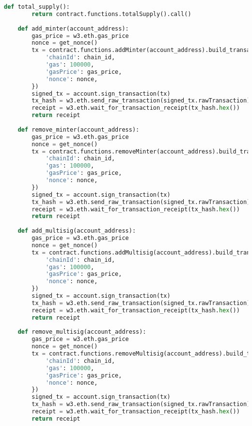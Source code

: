 \begin{lstlisting}[language=Python, caption=Функции выпуска дипломов]
    def total_supply():
        return contract.functions.totalSupply().call()
    
    def add_minter(account_address):
        gas_price = w3.eth.gas_price
        nonce = get_nonce()
        tx = contract.functions.addMinter(account_address).build_transaction({
            'chainId': chain_id,
            'gas': 100000,
            'gasPrice': gas_price,
            'nonce': nonce,
        })
        signed_tx = account.sign_transaction(tx)
        tx_hash = w3.eth.send_raw_transaction(signed_tx.rawTransaction)
        receipt = w3.eth.wait_for_transaction_receipt(tx_hash.hex())
        return receipt
    
    def remove_minter(account_address):
        gas_price = w3.eth.gas_price
        nonce = get_nonce()
        tx = contract.functions.removeMinter(account_address).build_transaction({
            'chainId': chain_id,
            'gas': 100000,
            'gasPrice': gas_price,
            'nonce': nonce,
        })
        signed_tx = account.sign_transaction(tx)
        tx_hash = w3.eth.send_raw_transaction(signed_tx.rawTransaction)
        receipt = w3.eth.wait_for_transaction_receipt(tx_hash.hex())
        return receipt
    
    def add_multisig(account_address):
        gas_price = w3.eth.gas_price
        nonce = get_nonce()
        tx = contract.functions.addMultisig(account_address).build_transaction({
            'chainId': chain_id,
            'gas': 100000,
            'gasPrice': gas_price,
            'nonce': nonce,
        })
        signed_tx = account.sign_transaction(tx)
        tx_hash = w3.eth.send_raw_transaction(signed_tx.rawTransaction)
        receipt = w3.eth.wait_for_transaction_receipt(tx_hash.hex())
        return receipt
    
    def remove_multisig(account_address):
        gas_price = w3.eth.gas_price
        nonce = get_nonce()
        tx = contract.functions.removeMultisig(account_address).build_transaction({
            'chainId': chain_id,
            'gas': 100000,
            'gasPrice': gas_price,
            'nonce': nonce,
        })
        signed_tx = account.sign_transaction(tx)
        tx_hash = w3.eth.send_raw_transaction(signed_tx.rawTransaction)
        receipt = w3.eth.wait_for_transaction_receipt(tx_hash.hex())
        return receipt
\end{lstlisting}

